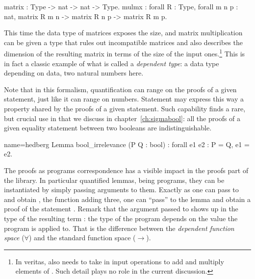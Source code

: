 \begin{coq}{}{}
matrix : Type -> nat -> nat -> Type.
mulmx : forall R : Type, forall m n p : nat,
  matrix R m n -> matrix R n p -> matrix R m p.
\end{coq}

This time the data type of matrices exposes the size, and matrix multiplication
can be given a type that rules out incompatible matrices and also describes
the dimension of the resulting matrix in terms of the size of the input
ones.\footnote{In veritas,  also needs to take in input operations to
add and multiply elements of .  Such detail plays no role in the current
discussion.}
This is in fact a classic example of what is called a \emph{dependent type}: a
data type depending on data, two natural numbers here.

Note that in this formalism, quantification can range on the proofs of
a given statement, just like it can range on numbers. Statement may
express this
way a property shared by the proofs of a given statement. Such capability
finds a rare, but
crucial use in \mcbMC{} that we discuss in chapter~\ref{ch:sigmabool}:
all the proofs of a given equality statement between two booleans are
indistinguishable.

\begin{coq}{name=hedberg}{}
Lemma bool_irrelevance (P Q : bool) : forall e1 e2 : P = Q, e1 = e2.
\end{coq}


The proofs as programs correspondence has a visible impact in the proofs
part of the \mcbMC{} library.  In particular quantified lemmas, being programs,
they can be instantiated by simply passing arguments to them.  Exactly as one can
pass  to  and obtain , the function adding three, one
can ``pass''  to the lemma  and obtain a proof of the statement
.  Remark that the argument passed to 
shows up in the type of the resulting term :  the type of the
 program depends on the value the program is applied to.  That is the
difference between the \emph{dependent function space} ($\forall$)
and the standard function space ($\to$).


